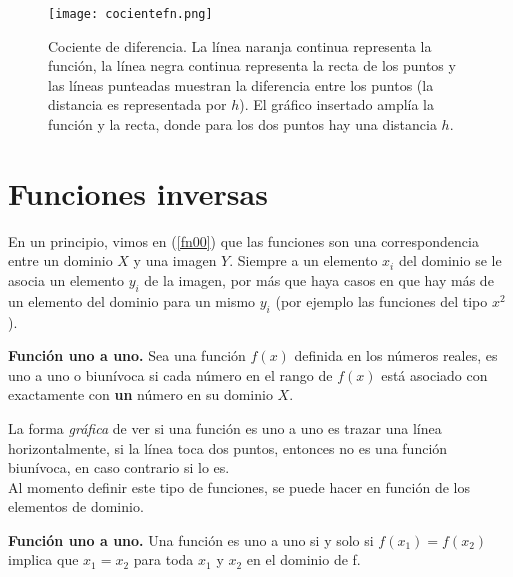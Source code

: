 \begin{center}
\begin{figure}[h!]
\centering
\texttt{[image: cocientefn.png]}
\caption[Cociente de diferencia.]{Cociente de diferencia. La línea naranja continua representa la función, la línea negra continua representa la recta de los puntos y las líneas punteadas muestran la diferencia entre los puntos (la distancia es representada por $h$). El gráfico insertado amplía la función y la recta, donde para los dos puntos hay una distancia $h$.} \label{cocifn}
\end{figure}
\end{center}

\section{Funciones inversas}
En un principio, vimos en (\ref{fn00}) que las funciones son una correspondencia entre un dominio $X$ y una imagen $Y$. Siempre a un elemento $x_{i}$ del dominio se le asocia un elemento $y_{i}$ de la imagen, por más que haya casos en que hay más de un elemento del dominio para un mismo $y_{i}$ (por ejemplo las funciones del tipo $x^{2}$).

\begin{mydef}
\textbf{Función uno a uno.} Sea una función $f(x)$ definida en los números reales, es uno a uno o biunívoca si cada número en el rango de $f(x)$ está asociado con exactamente con \textbf{un} número en su dominio $X$.  
\end{mydef}

La forma \textit{gráfica} de ver si una función es uno a uno es trazar una línea horizontalmente, si la línea toca dos puntos, entonces no es una función biunívoca, en caso contrario si lo es.\\
Al momento definir este tipo de funciones, se puede hacer en función de los elementos de dominio.

\begin{mydef}
\textbf{Función uno a uno.} Una función es uno a uno si y solo si $f(x_{1})=f(x_{2})$ implica que $x_{1}=x_{2}$ para toda $x_{1}$ y $x_{2}$ en el dominio de f.
\end{mydef}

